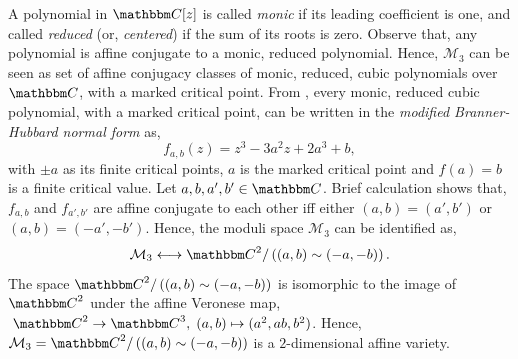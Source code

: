 \documentclass[reqno]{amsart}
\numberwithin{equation}{section}
\theoremstyle{plain}
\theoremstyle{definition}
\theoremstyle{definition}
\newcommand{\C}{{\mathbbm C}}
\begin{document}
    A polynomial in $\C[z]$ is called \emph{monic} if its leading coefficient is one, and called \emph{reduced} (or, \emph{centered}) if the sum of its roots is zero. Observe that, any polynomial is affine conjugate to a monic, reduced polynomial. Hence, $\mathcal{M}_{3}$ can be seen as set of affine conjugacy classes of monic, reduced, cubic polynomials over $\C$, with a marked critical point. From \cite{inbook}, every monic, reduced cubic polynomial, with a marked critical point, can be written in the \emph{modified Branner-Hubbard normal form} as,
    \begin{equation}\label{maineq}
        f_{a,b}(z)=z^{3}- 3a^{2}z +2a^{3} +b,
    \end{equation} 
    with $\pm a$ as its finite critical points, $a$ is the marked critical point and $f(a)=b$ is a finite critical value. Let $a,b,a',b' \in \C$. Brief calculation shows that, $f_{a,b}$ and $f_{a',b'}$ are affine conjugate to each other iff either $(a,b)=(a',b')$ or $(a,b)=(-a',-b')$. Hence, the moduli space $\mathcal{M}_{3}$ can be identified as, 
    $$\mathcal{M}_{3} \longleftrightarrow \C^{2}/\left((a,b)\sim(-a,-b)\right).$$ 
    The space $\C^{2}/\left((a,b)\sim(-a,-b)\right)$ is isomorphic to the image of $\C^{2}$ under the affine Veronese map, $\; \C^{2} \rightarrow \C^{3},\; (a,b) \mapsto (a^{2}, ab, b^{2})$. Hence, $\mathcal{M}_{3} = \C^{2}/\left((a,b)\sim(-a,-b)\right)$ is a $2$-dimensional affine variety.
\end{document}
